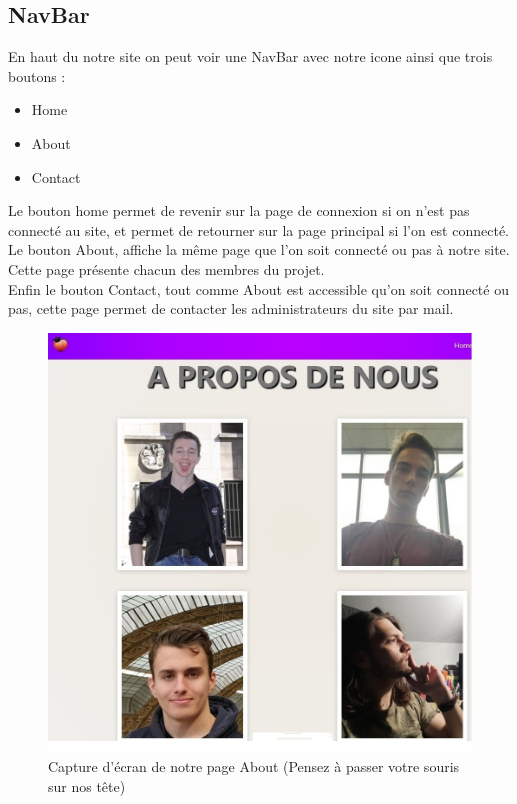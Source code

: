\documentclass[12pt]{report}
\begin{document}
\subsection{NavBar}
	En haut du notre site on peut voir une NavBar avec notre icone ainsi que trois boutons : \\
	\begin{itemize}
		\item Home
		\item About 
		\item Contact
	\end{itemize}
Le bouton home permet de revenir sur la page de connexion si on n'est pas connecté au site, et permet de retourner sur la page principal si l'on est connecté.\\
Le bouton About, affiche la même page que l'on soit connecté ou pas à notre site. Cette page présente chacun des membres du projet.\\
Enfin le bouton Contact, tout comme About est accessible qu'on soit connecté ou pas, cette page permet de contacter les administrateurs du site par mail.
\begin{figure}[h!]
	\begin{center}
		\includegraphics[scale=0.7]{Aboutus.jpg}
	\end{center}
		\caption{Capture d'écran de notre page About (Pensez à passer votre souris sur nos tête)}
\end{figure}
\clearpage
\end{document}
